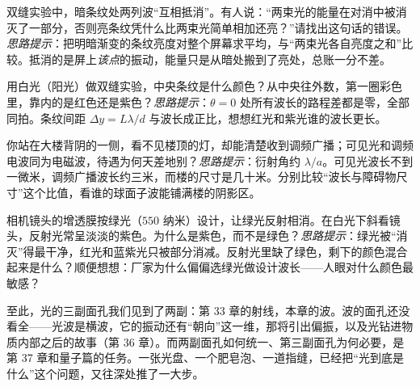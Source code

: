 \begin{puzzles}
\item 双缝实验中，暗条纹处两列波“互相抵消”。有人说：“两束光的能量在对消中被消灭了一部分，否则亮条纹凭什么比两束光简单相加还亮？”请找出这句话的错误。\emph{思路提示}：把明暗渐变的条纹亮度对整个屏幕求平均，与“两束光各自亮度之和”比较。抵消的是屏上\emph{该点}的振动，能量只是从暗处搬到了亮处，总账一分不差。
\item 用白光（阳光）做双缝实验，中央条纹是什么颜色？从中央往外数，第一圈彩色里，靠内的是红色还是紫色？\emph{思路提示}：\(\theta=0\) 处所有波长的路程差都是零，全部同拍。条纹间距 \(\Delta y=L\lambda/d\) 与波长成正比，想想红光和紫光谁的波长更长。
\item 你站在大楼背阴的一侧，看不见楼顶的灯，却能清楚收到调频广播；可见光和调频电波同为电磁波，待遇为何天差地别？\emph{思路提示}：衍射角约 \(\lambda/a\)。可见光波长不到一微米，调频广播波长约三米，而楼的尺寸是几十米。分别比较“波长与障碍物尺寸”这个比值，看谁的球面子波能铺满楼的阴影区。
\item 相机镜头的增透膜按绿光（\(550\) 纳米）设计，让绿光反射相消。在白光下斜看镜头，反射光常呈淡淡的紫色。为什么是紫色，而不是绿色？\emph{思路提示}：绿光被“消灭”得最干净，红光和蓝紫光只被部分消减。反射光里缺了绿色，剩下的颜色混合起来是什么？顺便想想：厂家为什么偏偏选绿光做设计波长——人眼对什么颜色最敏感？
\end{puzzles}

至此，光的三副面孔我们见到了两副：第 33 章的射线，本章的波。波的面孔还没看全——光波是横波，它的振动还有“朝向”这一维，那将引出偏振，以及光钻进物质内部之后的故事（第 36 章）。而两副面孔如何统一、第三副面孔为何必要，是第 37 章和量子篇的任务。一张光盘、一个肥皂泡、一道指缝，已经把“光到底是什么”这个问题，又往深处推了一大步。

